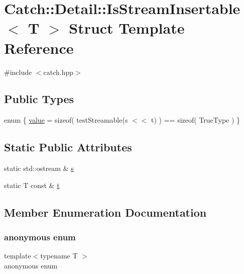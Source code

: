 \hypertarget{struct_catch_1_1_detail_1_1_is_stream_insertable}{}\section{Catch\+:\+:Detail\+:\+:Is\+Stream\+Insertable$<$ T $>$ Struct Template Reference}
\label{struct_catch_1_1_detail_1_1_is_stream_insertable}


{\ttfamily \#include $<$catch.\+hpp$>$}

\subsection*{Public Types}
\begin{DoxyCompactItemize}
\item 
enum \{ \mbox{\hyperlink{struct_catch_1_1_detail_1_1_is_stream_insertable_a2e4508694da3bf368ff67733a7970edda765a324929702bfce2969fc19fc4f926}{value}} = sizeof( test\+Streamable(s $<$$<$ t) ) == sizeof( True\+Type )
 \}
\end{DoxyCompactItemize}
\subsection*{Static Public Attributes}
\begin{DoxyCompactItemize}
\item 
static std\+::ostream \& \mbox{\hyperlink{struct_catch_1_1_detail_1_1_is_stream_insertable_abe3d3c8e5d85665747faafffc9a96b00}{s}}
\item 
static T const  \& \mbox{\hyperlink{struct_catch_1_1_detail_1_1_is_stream_insertable_a7d2a3da978b6736667a7b2f6d51f507f}{t}}
\end{DoxyCompactItemize}


\subsection{Member Enumeration Documentation}
\mbox{\label{struct_catch_1_1_detail_1_1_is_stream_insertable_a2e4508694da3bf368ff67733a7970edd}} 
\subsubsection{\texorpdfstring{anonymous enum}{anonymous enum}}
{\footnotesize\ttfamily template$<$typename T $>$ \\
anonymous enum}

